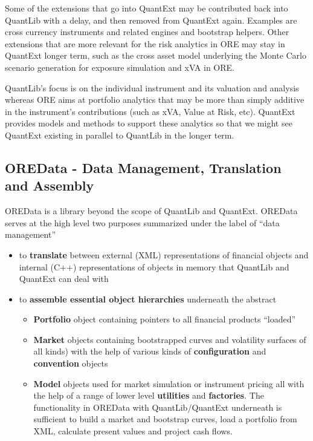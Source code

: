 \documentclass[12pt, a4paper]{article}
\begin{document}
Some of the extensions that go into QuantExt may be contributed back into QuantLib with a delay, and then removed from QuantExt again. Examples are cross currency instruments and related engines and bootstrap helpers. Other extensions that are more
relevant for the risk analytics in ORE may stay in QuantExt longer term, such as the cross asset model underlying the Monte Carlo scenario generation for exposure simulation and xVA in ORE.

QuantLib's focus is on the individual instrument and its valuation and analysis whereas ORE aims at portfolio analytics that may be more than simply additive in the instrument's contributions (such as xVA, Value at Risk, etc). QuantExt provides
models and methods to support these analytics so that we might see QuantExt existing in parallel to QuantLib in the longer term.

\subsection*{OREData - Data Management, Translation and Assembly}

OREData is a library beyond the scope of QuantLib and QuantExt. OREData serves at the high level two purposes summarized under the label of ``data management''
\begin{itemize}
\item to {\bf translate} between external (XML) representations of financial objects and internal (C++) representations of objects in memory that QuantLib and QuantExt can deal with
\item to {\bf assemble essential object hierarchies} underneath the abstract
\begin{itemize}
\item {\bf Portfolio} object containing pointers to all financial products ``loaded''
\item {\bf Market} objects containing bootstrapped curves and volatility surfaces of all kinds) with the help of various kinds of {\bf configuration} and {\bf convention} objects
\item {\bf Model} objects used for market simulation or instrument pricing all with the help of a range of lower level {\bf utilities} and {\bf factories}. 
The functionality in OREData with QuantLib/QuantExt underneath is sufficient to build a market and bootstrap curves, load a portfolio from XML, calculate present values and project cash flows.
\end{itemize}
\end{itemize}
\end{document}
